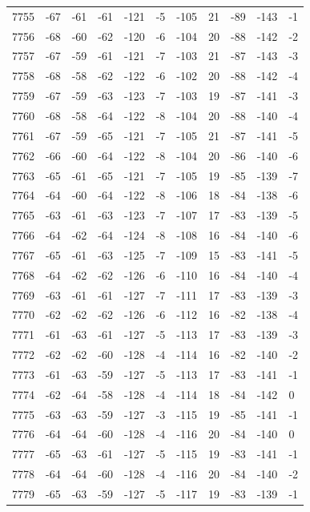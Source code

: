\begin{table}[H]
\begin{tabular}{lllllllllll}
7755 & -67 & -61 & -61 & -121 & -5 & -105 & 21 & -89 & -143 & -1 \\
7756 & -68 & -60 & -62 & -120 & -6 & -104 & 20 & -88 & -142 & -2 \\
7757 & -67 & -59 & -61 & -121 & -7 & -103 & 21 & -87 & -143 & -3 \\
7758 & -68 & -58 & -62 & -122 & -6 & -102 & 20 & -88 & -142 & -4 \\
7759 & -67 & -59 & -63 & -123 & -7 & -103 & 19 & -87 & -141 & -3 \\
7760 & -68 & -58 & -64 & -122 & -8 & -104 & 20 & -88 & -140 & -4 \\
7761 & -67 & -59 & -65 & -121 & -7 & -105 & 21 & -87 & -141 & -5 \\
7762 & -66 & -60 & -64 & -122 & -8 & -104 & 20 & -86 & -140 & -6 \\
7763 & -65 & -61 & -65 & -121 & -7 & -105 & 19 & -85 & -139 & -7 \\
7764 & -64 & -60 & -64 & -122 & -8 & -106 & 18 & -84 & -138 & -6 \\
7765 & -63 & -61 & -63 & -123 & -7 & -107 & 17 & -83 & -139 & -5 \\
7766 & -64 & -62 & -64 & -124 & -8 & -108 & 16 & -84 & -140 & -6 \\
7767 & -65 & -61 & -63 & -125 & -7 & -109 & 15 & -83 & -141 & -5 \\
7768 & -64 & -62 & -62 & -126 & -6 & -110 & 16 & -84 & -140 & -4 \\
7769 & -63 & -61 & -61 & -127 & -7 & -111 & 17 & -83 & -139 & -3 \\
7770 & -62 & -62 & -62 & -126 & -6 & -112 & 16 & -82 & -138 & -4 \\
7771 & -61 & -63 & -61 & -127 & -5 & -113 & 17 & -83 & -139 & -3 \\
7772 & -62 & -62 & -60 & -128 & -4 & -114 & 16 & -82 & -140 & -2 \\
7773 & -61 & -63 & -59 & -127 & -5 & -113 & 17 & -83 & -141 & -1 \\
7774 & -62 & -64 & -58 & -128 & -4 & -114 & 18 & -84 & -142 & 0 \\
7775 & -63 & -63 & -59 & -127 & -3 & -115 & 19 & -85 & -141 & -1 \\
7776 & -64 & -64 & -60 & -128 & -4 & -116 & 20 & -84 & -140 & 0 \\
7777 & -65 & -63 & -61 & -127 & -5 & -115 & 19 & -83 & -141 & -1 \\
7778 & -64 & -64 & -60 & -128 & -4 & -116 & 20 & -84 & -140 & -2 \\
7779 & -65 & -63 & -59 & -127 & -5 & -117 & 19 & -83 & -139 & -1 \\

\end{tabular}
\end{table}

